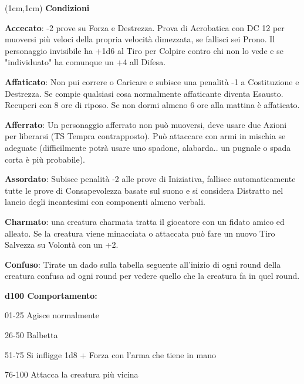 \documentclass[a4paper,12 pt,openany]{book}
\begin{document}
	\center
	
	\begin{textblock*}{19 cm}(1cm,1cm) %
		\flushleft
		\textbf{Condizioni}\\
		\footnotesize 	
		
		\begin{multicols}{2}
			
			\textbf{Accecato}: -2 prove su Forza e Destrezza. 
			Prova di Acrobatica con DC 12 per muoversi più veloci della propria velocità dimezzata, se fallisci sei Prono.
			Il personaggio invisibile ha +1d6 al Tiro per Colpire contro chi non lo vede e se "individuato" ha comunque un +4 all Difesa.
			
			\textbf{Affaticato}: Non pui correre o Caricare e subisce una penalità -1 a Costituzione e Destrezza. Se compie qualsiasi cosa normalmente affaticante diventa Esausto.
			Recuperi con 8 ore di riposo. Se non dormi almeno 6 ore alla mattina è affaticato.
			
			\textbf{Afferrato}: Un personaggio afferrato non può muoversi, deve usare due Azioni per liberarsi (TS Tempra contrapposto). Può attaccare con armi in mischia se adeguate (difficilmente potrà usare uno spadone, alabarda.. un pugnale o spada corta è più probabile).
			
			\textbf{Assordato}: Subisce penalità -2 alle prove di Iniziativa, fallisce automaticamente tutte le prove di Consapevolezza basate sul suono e si considera Distratto nel lancio degli incantesimi con componenti almeno verbali.
			
			\textbf{Charmato}: una creatura charmata tratta il giocatore con un fidato amico ed alleato. Se la creatura viene minacciata o attaccata può fare un nuovo Tiro Salvezza su Volontà con un +2.
			
			\textbf{Confuso}:  Tirate un dado sulla tabella seguente all'inizio di ogni round della creatura confusa ad ogni round per vedere quello che la creatura fa in quel round.
			
			\textbf{d100 Comportamento:}
			
			01-25 Agisce normalmente
			
			26-50 Balbetta
			
			51-75 Si infligge 1d8 + Forza con l'arma che tiene in mano
			
			76-100 Attacca la creatura più vicina 
			

\end{multicols}
\end{textblock*}
\end{document}
